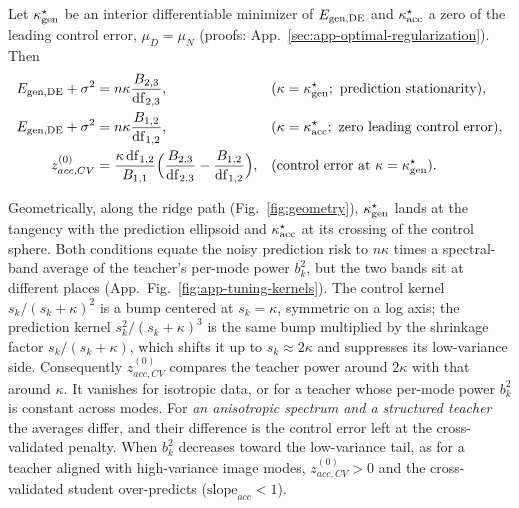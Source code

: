\begin{prop}\label{prop:pixel-tuning}
Let $\kappa_{\rm gen}^{\star}$ be an interior differentiable minimizer of $E_{\rm gen,DE}$ and $\kappa_{\rm acc}^{\star}$ a zero of the leading control error, $\mu_D=\mu_N$ (proofs: App.~\ref{sec:app-optimal-regularization}). Then
\begin{align}
E_{\rm gen,DE}+\sigma^2
&=n\kappa\frac{B_{2,3}}{\mathrm{df}_{2,3}},
&&(\kappa=\kappa_{\rm gen}^{\star};\ \text{prediction stationarity}),
\label{eq:gen_optim_reg_cond}\\
E_{\rm gen,DE}+\sigma^2
&=n\kappa\frac{B_{1,2}}{\mathrm{df}_{1,2}},
&&(\kappa=\kappa_{\rm acc}^{\star};\ \text{zero leading control error}),
\label{eq:acc_optim_reg_cond1}\\
z^{(0)}_{acc,CV}
&=\frac{\kappa\,\mathrm{df}_{1,2}}{B_{1,1}}\Big(\frac{B_{2,3}}{\mathrm{df}_{2,3}}-\frac{B_{1,2}}{\mathrm{df}_{1,2}}\Big),
&&(\text{control error at }\kappa=\kappa_{\rm gen}^{\star}).
\label{eq:pixel-zacc-cv}
\end{align}
\end{prop}
Geometrically, along the ridge path (Fig.~\ref{fig:geometry}), $\kappa_{\rm gen}^{\star}$ lands at the tangency with the prediction ellipsoid and $\kappa_{\rm acc}^{\star}$ at its crossing of the control sphere.
Both conditions equate the noisy prediction risk to $n\kappa$ times a spectral-band average of the teacher's per-mode power $b_k^2$, but the two bands sit at different places (App.~Fig.~\ref{fig:app-tuning-kernels}). The control kernel $s_k/(s_k+\kappa)^2$ is a bump centered at $s_k=\kappa$, symmetric on a log axis; the prediction kernel $s_k^2/(s_k+\kappa)^3$ is the same bump multiplied by the shrinkage factor $s_k/(s_k+\kappa)$, which shifts it up to $s_k\approx2\kappa$ and suppresses its low-variance side.
Consequently $z^{(0)}_{acc,CV}$ compares the teacher power around $2\kappa$ with that around $\kappa$.
It vanishes for isotropic data, or for a teacher whose per-mode power $b_k^2$ is constant across modes. %
For \textit{an anisotropic spectrum and a structured teacher} the averages differ, and their difference is the control error left at the cross-validated penalty. When $b_k^2$ decreases toward the low-variance tail, as for a teacher aligned with high-variance image modes, $z^{(0)}_{acc,CV}>0$ and the cross-validated student over-predicts ($\mathrm{slope}_{acc}<1$). %

